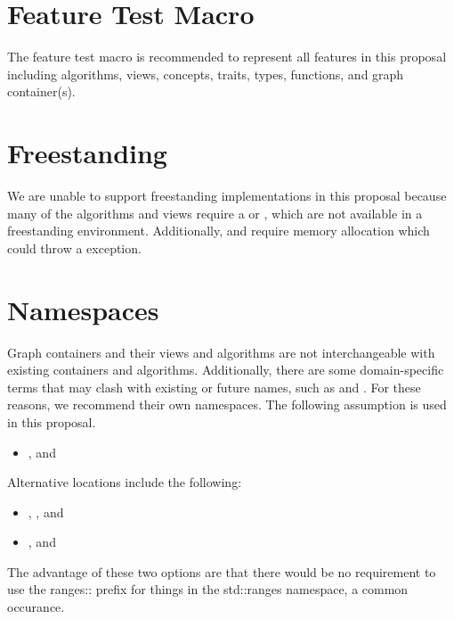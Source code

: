 
\section{Feature Test Macro}
The  feature test macro is recommended to represent all features in this proposal including algorithms, views, concepts, traits, types, functions, and graph container(s).

\section{Freestanding}
We are unable to support freestanding implementations in this proposal because many of the algorithms and views 
require a  or , which are not available in a freestanding environment. 
Additionally,  and  require memory allocation which could throw a  
exception.

\section{Namespaces}
Graph containers and their views and algorithms are not interchangeable with existing containers and algorithms.
Additionally, there are some domain-specific terms that may clash with existing or future names, such as 
 and .
For these reasons, we recommend their own namespaces. The following assumption is used in this proposal.
\begin{itemize}
\item[],  and 
\end{itemize}

\noindent
Alternative locations include the following:
\begin{itemize}
\item[], , and 
\item[],  and 
\end{itemize}
The advantage of these two options are that there would be no requirement to use the ranges:: prefix for things
in the std::ranges namespace, a common occurance.

